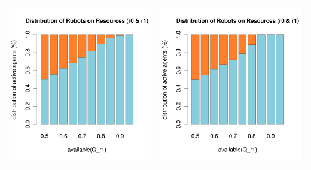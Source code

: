 \documentclass[a4paper,10pt]{article}
\begin{document}
\begin{table}[H]
\begin{tabular}{cc}
\includegraphics[width=\imgSize]{../images/5StaticEnv/barplotAliveR1AndR2_mean_env1_normalized}& \includegraphics[width=\imgSize]{../images/5StaticEnv/barplotAliveR1AndR2_median_env1_normalized}
\end{tabular}
\end{table}
\end{document}
